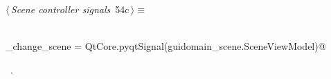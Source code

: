 \documentclass[
    a4paper,      %
    10pt,         %
    openright,    %
    notitlepage,  %
    parskip=half, %
]{scrreprt}       %
\theoremstyle{definition}                    %
\begin{document}
\begin{flushleft} \small
\begin{minipage}{\linewidth}\label{scrap86}\raggedright\small
{} $\langle\,${\itshape Scene controller signals}\nobreak\ {\footnotesize {54c}}$\,\rangle\equiv$
\vspace{-1exm}
\begin{list}{}{} \item
\mbox{}\lstinline@@\\
\mbox{}\lstinline@do_change_scene = QtCore.pyqtSignal(guidomain_scene.SceneViewModel)@\\
\mbox{}\lstinline@@{\NWsep}
\end{list}
\vspace{-1.5ex}
\footnotesize
\begin{list}{}{\setlength{\itemsep}{-\parsep}\setlength{\itemindent}{-\leftmargin}}
\item \NWtxtMacroRefIn\ .

\item{}
\end{list}
\end{minipage}\vspace{4ex}
\end{flushleft}
\end{document}
